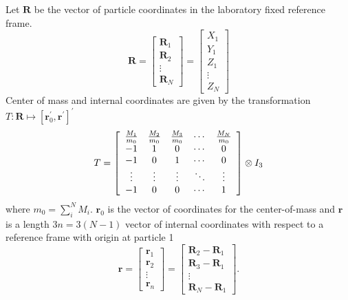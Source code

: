 \documentclass[12pt,thmsa]{article}
\begin{document}
Let $\mathbf{R}$ be the vector of particle coordinates in the laboratory
fixed reference frame. 
\begin{equation}
\mathbf{R=}\left[ 
\begin{array}{c}
\mathbf{R}_1 \\ 
\mathbf{R}_2 \\ 
\vdots  \\ 
\mathbf{R}_N
\end{array}
\right] =\left[ 
\begin{array}{c}
X_1 \\ 
Y_1 \\ 
Z_1 \\ 
\vdots  \\ 
Z_N
\end{array}
\right] 
\end{equation}
Center of mass and internal coordinates are given by the transformation $T:%
\mathbf{R}\mapsto [\mathbf{r}_0^{\prime },\mathbf{r}^{\prime }]^{\prime }$ 
\begin{equation}
T=\left[ 
\begin{array}{ccccc}
\frac{M_1}{m_0} & \frac{M_2}{m_0} & \frac{M_3}{m_0} & \cdots  & \frac{M_N}{%
m_0} \\ 
-1 & 1 & 0 & \cdots  & 0 \\ 
-1 & 0 & 1 & \cdots  & 0 \\ 
\vdots  & \vdots  & \vdots  & \ddots  & \vdots  \\ 
-1 & 0 & 0 & \cdots  & 1
\end{array}
\right] \otimes I_3  \label{Ttran}
\end{equation}
where $m_0=\sum_i^NM_i$. $\mathbf{r}_0$ is the vector of coordinates for the
center-of-mass and $\mathbf{r}$ is a length $3n=3\left( N-1\right) $ vector
of internal coordinates with respect to a reference frame with origin at
particle 1 
\begin{equation}
\mathbf{r=}\left[ 
\begin{array}{c}
\mathbf{r}_1 \\ 
\mathbf{r}_2 \\ 
\vdots  \\ 
\mathbf{r}_n
\end{array}
\right] =\left[ 
\begin{array}{c}
\mathbf{R}_2-\mathbf{R}_1 \\ 
\mathbf{R}_3-\mathbf{R}_1 \\ 
\vdots  \\ 
\mathbf{R}_N-\mathbf{R}_1
\end{array}
\right] .  \label{rdef}
\end{equation}
\end{document}

